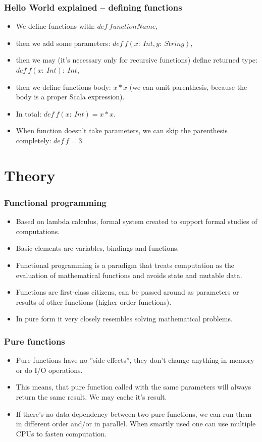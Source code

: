\documentclass[xcolor=dvipsnames]{beamer}
\begin{document}
\begin{frame}
\frametitle{Hello World explained -- defining functions}
\begin{itemize}
\item We define functions with: $def\:functionName$,
\item then we add some parameters: $def\:f(x:\:Int, y:\:String)$,
\item then we may (it's necessary only for recursive functions) define returned type: $def\:f(x:\:Int):\:Int$,
\item then we define functions body: $x * x$ (we can omit parenthesis, because the body is a proper Scala expression).
\item In total: $def\:f(x:\:Int) = x * x$.
\item When function doesn't take parameters, we can skip the parenthesis completely: $def\:f = 3$
\end{itemize}
\end{frame}


\section{Theory}

\begin{frame}
\frametitle{Functional programming}
\begin{itemize}
\item Based on lambda calculus, formal system created to support formal studies of computations.
\item Basic elements are variables, bindings and functions.
\item Functional programming is a paradigm that treats computation as the evaluation of mathematical functions and avoids state and mutable data.
\item Functions are first-class citizens, can be passed around as parameters or results of other functions (higher-order functions).
\item In pure form it very closely resembles solving mathematical problems.
\end{itemize}
\end{frame}

\begin{frame}
\frametitle{Pure functions}
\begin{itemize}
\item Pure functions have no ''side effects'', they don't change anything in memory or do I/O operations.
\item This means, that pure function called with the same parameters will always return the same result. We may cache it's result.
\item If there's no data dependency between two pure functions, we can run them in different order and/or in parallel. When smartly used one can use multiple CPUs to fasten computation.
\end{itemize}
\end{frame}
\end{document}
